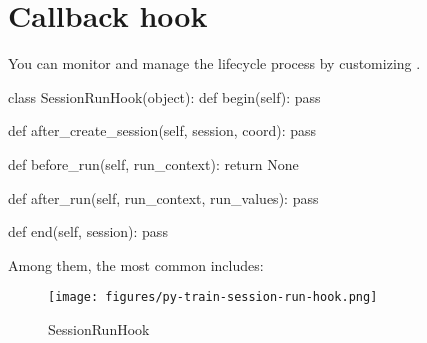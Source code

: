 \section{Callback hook}
\begin{content}
You can monitor and manage the  lifecycle process by customizing .

\begin{leftbar}
\begin{python}
class SessionRunHook(object):
  def begin(self):
    pass

  def after_create_session(self, session, coord):
    pass

  def before_run(self, run_context):
    return None

  def after_run(self, run_context, run_values):
    pass

  def end(self, session):
    pass
\end{python}
\end{leftbar}

Among them, the most common  includes:

\begin{enum}
\end{enum}

\begin{figure}[!htbp]
  \centering
  \texttt{[image: figures/py-train-session-run-hook.png]}
  \caption{SessionRunHook}
  \label{fig:py-train-session-run-hook}
\end{figure}

\end{content}
